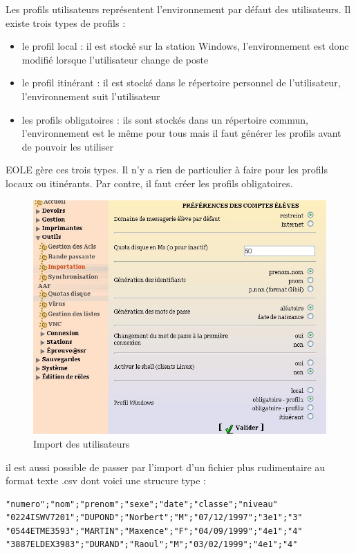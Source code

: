 \documentclass{article}
\makeatletter
\def\maxwidth{\ifdim\Gin@nat@width>\linewidth\linewidth
\else\Gin@nat@width\fi}
\let\Oldincludegraphics\includegraphics
\renewcommand{\includegraphics}[1]{\Oldincludegraphics[width=\maxwidth]{#1}}
\makeatother
\begin{document}
Les profils utilisateurs représentent l'environnement par défaut des
utilisateurs. Il existe trois types de profils :

\begin{itemize}
\item
  le profil local : il est stocké sur la station Windows,
  l'environnement est donc modifié lorsque l'utilisateur change de poste
\item
  le profil itinérant : il est stocké dans le répertoire personnel de
  l'utilisateur, l'environnement suit l'utilisateur
\item
  les profils obligatoires : ils sont stockés dans un répertoire commun,
  l'environnement est le même pour tous mais il faut générer les profils
  avant de pouvoir les utiliser
\end{itemize}
EOLE gère ces trois types. Il n'y a rien de particulier à faire pour les
profils locaux ou itinérants. Par contre, il faut créer les profils
obligatoires.

\begin{figure}[htbp]
\centering
\includegraphics{scribe_html_10e3ad18.jpg}
\caption{Import des utilisateurs}
\end{figure}

il est aussi possible de passer par l'import d'un fichier plus
rudimentaire au format texte .csv dont voici une strucure type :

\begin{lstlisting}
"numero";"nom";"prenom";"sexe";"date";"classe";"niveau"
"0224ISWV7201";"DUPOND";"Norbert";"M";"07/12/1997";"3e1";"3"
"0544ETME3593";"MARTIN";"Maxence";"F";"04/09/1999";"4e1";"4"
"3887ELDEX3983";"DURAND";"Raoul";"M";"03/02/1999";"4e1";"4"
\end{lstlisting}
\end{document}

